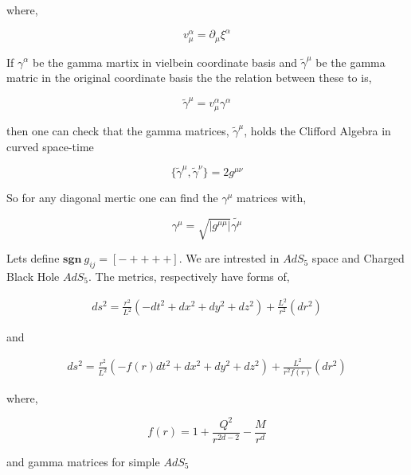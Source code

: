 where,

\begin{equation}
   v^{\alpha}_{\mu} = \partial_{\mu} \xi^{\alpha}
\end{equation}

If $\gamma^{\alpha}$ be the gamma martix in vielbein coordinate basis and $\tilde{\gamma}^{\mu}$ be the gamma matric in the original coordinate basis the the relation between these to is,

\begin{equation}
   \tilde{\gamma}^{\mu} = v^{\alpha}_{\mu} \gamma^{\alpha}
\end{equation}

then one can check that the gamma matrices, $\tilde{\gamma}^{\mu}$, holds the Clifford Algebra in curved space-time

\begin{equation}
   \{\tilde{\gamma}^{\mu},\tilde{\gamma}^{\nu}\} = 2g^{\mu\nu}
\end{equation}

So for any diagonal mertic one can find the $\gamma^{\mu}$ matrices with,

\begin{equation}
   \gamma^{\mu} = \sqrt{|g^{\mu\mu}|}\tilde{\gamma^{\mu}}
\end{equation}

Lets define $\mathbf{sgn}~g_{ij}=[- + + + +]$. We are intrested in $AdS_5$ space and Charged Black Hole $AdS_5$. The metrics, respectively have forms of,

\begin{align}
   ds^2 = \frac{r^2}{L^2}(-dt^2 + dx^2 + dy^2 + dz^2) + \frac{L^2}{r^2}(dr^2)
\end{align}

and 

\begin{align}
   ds^2 = \frac{r^2}{L^2}(-f(r)dt^2 + dx^2 + dy^2 + dz^2) + \frac{L^2}{r^2f(r)}(dr^2)
\end{align}

where,

\begin{equation}
   f(r) = 1 + \frac{Q^2}{r^{2d-2}} - \frac{M}{r^d}
\end{equation}

and gamma matrices for simple $AdS_5$ 

